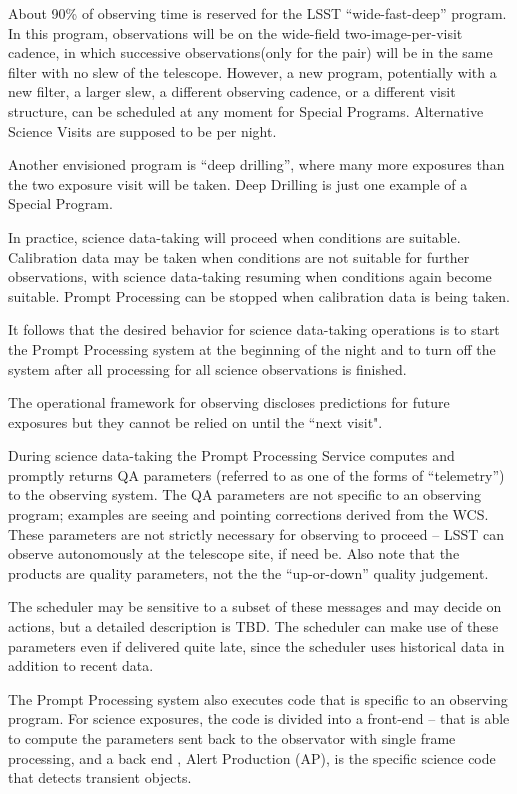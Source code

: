 About 90\% of observing time is reserved for the LSST “wide-fast-deep”
program. In this program, observations will be on the wide-field
two-image-per-visit cadence, in which successive observations(only for the pair)  will be
in the same filter with no slew of the telescope. However, a new
program, potentially with a new filter, a larger slew, a different
observing cadence, or a different visit structure, can be scheduled at
any moment for Special Programs. Alternative Science Visits are supposed to be per night.  

Another envisioned program is ``deep drilling'', where many more exposures
than the two exposure visit will be taken. Deep Drilling is just one example of a Special Program.  

In practice, science data-taking will proceed when conditions are
suitable. Calibration data may be taken when conditions are not
suitable for further observations, with science data-taking resuming
when conditions again become suitable. Prompt Processing can be stopped when calibration data is being taken.  

It follows that the desired behavior for science data-taking
operations is to start the Prompt Processing system at the beginning
of the night and to turn off the system after all processing for all
science observations is finished.

The operational framework for observing discloses predictions for future exposures but they cannot be relied on until the “next visit".

During science data-taking the Prompt Processing Service computes and
promptly returns QA parameters (referred to as one of the forms of “telemetry”) to the
observing system. The QA parameters are not specific to an observing
program; examples are seeing and pointing corrections derived from the
WCS. These parameters are not strictly necessary for observing to
proceed -- LSST can observe autonomously at the telescope site, if
need be. Also note that the products are quality parameters, not the
the “up-or-down” quality judgement.

The scheduler may be sensitive to a subset of these messages and may
decide on actions, but a detailed description is TBD. 
The scheduler can make use of these parameters even
if delivered quite late, since the scheduler uses historical data
in addition to recent data.

The Prompt Processing system also executes code that is specific to an
observing program. For science exposures, the code is divided into
a front-end -- that is able to compute the parameters sent back  to the
observator with single frame processing, and a back end , Alert Production (AP), is the specific
science code that detects transient objects. 

